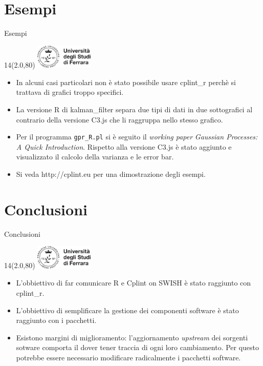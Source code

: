 \documentclass[11pt,xcolor={dvipsnames},default]{beamer} %
\newcommand{\MyLogo}{%
\begin{textblock}{14}(2.0,80)
 \includegraphics[height=1.15cm, angle=0]{logo}
\end{textblock}
}
\begin{document}
\section{Esempi}
\begin{frame}{Esempi}
\transboxin
\MyLogo
\begin{itemize}
\item In alcuni casi particolari non è stato possibile usare cplint\_r perchè 
si trattava di grafici troppo specifici.
\item La versione R di kalman\_filter separa due tipi di dati in due 
sottografici al contrario della versione C3.js che li raggruppa nello
stesso grafico.
\item Per il programma \texttt{gpr\_R.pl} si è seguito il 
\emph{working paper} \emph{Gaussian Processes: A Quick Introduction}. 
Rispetto alla versione C3.js è stato aggiunto e visualizzato il calcolo della 
varianza e le error bar.
\item Si veda http://cplint.eu per una dimostrazione degli esempi.
\end{itemize}
\end{frame}

\section{Conclusioni}
\begin{frame}{Conclusioni}
\transboxin
\MyLogo
\begin{itemize}
\item L'obbiettivo di far comunicare R e Cplint on SWISH è stato raggiunto con
cplint\_r.
\item L'obbiettivo di semplificare la gestione dei componenti software è stato 
raggiunto con i pacchetti.
\item Esistono margini di miglioramento: l'aggiornamento \emph{upstream} dei 
sorgenti sotware comporta il dover tener traccia di ogni loro cambiamento. 
Per questo potrebbe essere necessario modificare radicalmente i pacchetti 
software.
\end{itemize}
\end{frame}
\end{document}
